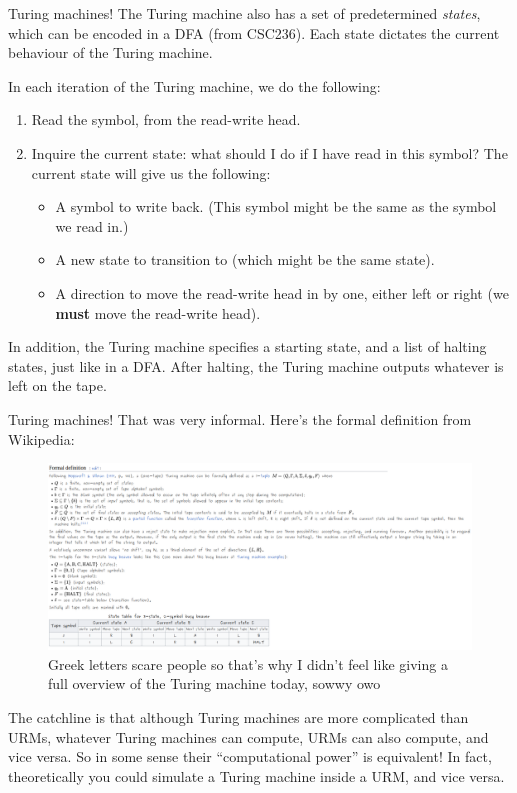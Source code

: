 \documentclass{beamer}
\begin{document}
\begin{frame}{Turing machines!}
The Turing machine also has a set of predetermined \textit{states}, which can be encoded in a DFA (from CSC236). Each state dictates the current behaviour of the Turing machine.

In each iteration of the Turing machine, we do the following:
\begin{enumerate}
\item Read the symbol, from the read-write head.
\item Inquire the current state: what should I do if I have read in this symbol? The current state will give us the following:
\begin{itemize}
\item A symbol to write back. (This symbol might be the same as the symbol we read in.)
\item A new state to transition to (which might be the same state).
\item A direction to move the read-write head in by one, either left or right (we \textbf{must} move the read-write head).
\end{itemize}
\end{enumerate}

In addition, the Turing machine specifies a starting state, and a list of halting states, just like in a DFA. After halting, the Turing machine outputs whatever is left on the tape.
\end{frame}

\begin{frame}{Turing machines!}
That was very informal. Here's the formal definition from Wikipedia:
\begin{figure}[h!]
\centering
\includegraphics[scale=0.15]{img/ss2.png}
\caption*{Greek letters scare people so that's why I didn't feel like giving a full overview of the Turing machine today, sowwy owo}
\end{figure}

The catchline is that although Turing machines are more complicated than URMs, whatever Turing machines can compute, URMs can also compute, and vice versa. So in some sense their ``computational power'' is equivalent! In fact, theoretically you could simulate a Turing machine inside a URM, and vice versa.

\end{frame}
\end{document}
